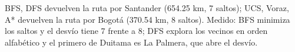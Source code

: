 {BFS, DFS devuelven la ruta por Santander (654.25 km, 7 saltos); UCS, Voraz, A* devuelven la ruta por Bogotá (370.54 km, 8 saltos).}
{Medido: BFS minimiza los saltos y el desvío tiene 7 frente a 8; DFS explora los vecinos en orden alfabético y el primero de Duitama es La Palmera, que abre el desvío.}
